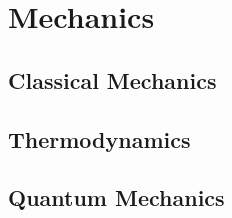 \section{Mechanics} 

\subsection{Classical Mechanics} 

\subsection{Thermodynamics} 

\subsection{Quantum Mechanics} 
